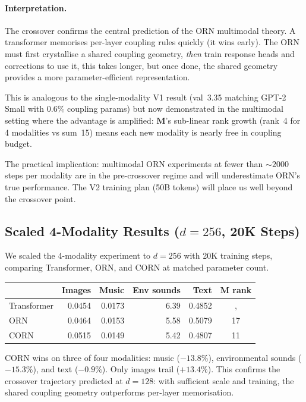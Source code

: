 \documentclass[11pt, a4paper]{article}
\newcommand{\M}{\mathbf{M}}
\theoremstyle{plain}
\theoremstyle{remark}
\begin{document}
\paragraph{Interpretation.}
The crossover confirms the central prediction of the ORN multimodal theory.
A transformer memorises per-layer coupling rules quickly (it wins early).
The ORN must first crystallise a shared coupling geometry, \emph{then} train response heads and corrections to use it, this takes longer, but once done, the shared geometry provides a more parameter-efficient representation.

This is analogous to the single-modality V1 result (val~3.35 matching GPT-2 Small with $0.6\%$ coupling params) but now demonstrated in the multimodal setting where the advantage is amplified: $\M$'s sub-linear rank growth (rank~4 for 4 modalities vs sum~15) means each new modality is nearly free in coupling budget.

The practical implication: multimodal ORN experiments at fewer than ${\sim}2000$ steps per modality are in the pre-crossover regime and will underestimate ORN's true performance.
The V2 training plan (50B tokens) will place us well beyond the crossover point.

\subsection{Scaled 4-Modality Results ($d{=}256$, 20K Steps)}

We scaled the 4-modality experiment to $d{=}256$ with 20K training steps, comparing Transformer, ORN, and CORN at matched parameter count.

\begin{center}\small
\begin{tabular}{@{}lrrrrc@{}}
\toprule
& \textbf{Images} & \textbf{Music} & \textbf{Env sounds} & \textbf{Text} & \textbf{M rank} \\
\midrule
Transformer & 0.0454 & 0.0173 & 6.39 & 0.4852 & ,  \\
ORN         & 0.0464 & 0.0153 & 5.58 & 0.5079 & 17 \\
CORN        & 0.0515 & 0.0149 & 5.42 & 0.4807 & 11 \\
\bottomrule
\end{tabular}
\end{center}

CORN wins on three of four modalities: music ($-13.8\%$), environmental sounds ($-15.3\%$), and text ($-0.9\%$).
Only images trail ($+13.4\%$).
This confirms the crossover trajectory predicted at $d{=}128$: with sufficient scale and training, the shared coupling geometry outperforms per-layer memorisation.
\end{document}
